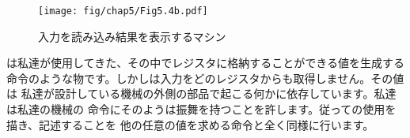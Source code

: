 \begin{figure}[tb]
\label{Figure 5.4}
\centering
\begin{comment}
\heading{Figure 5.4:} A \acronym{GCD} machine that reads inputs and prints results.

\begin{example}
                   .--------.
                    \ read /
                     \____/
                       |
               +-------*------+
               |              |
        a<-rd (X)            (X) b<-rd
               |              |
               V              V           ___
            +-----+        +-----+       /   \
            |  a  |<--(X)--+  b  +----->|  =  |
            +-+-+-+  a<-b  +-+---+       \___/
              | |            |  ^          ^
           +--+ +----+    +--+  |          |
           |         |    |    (X) b<-t   / \
           V         V    V     |        / O \
      .---------.  .---------.  |       /_____\
--(X)->\ print /    \  rem  /   |
   P    \_____/      \_____/    |
                        |       |
                       (X) t<-r |
                        |       |
                        V       |
                     +-----+    |
                     |  t  +----+
                     +-----+
\end{example}

\begin{scheme}
 (controller
  gcd-loop
    (assign a (op read))
    (assign b (op read))
  test-b
    (test (op =) (reg b) (const 0))
    (branch (label gcd-done))
    (assign t (op rem) (reg a) (reg b))
    (assign a (reg b))
    (assign b (reg t))
    (goto (label test-b))
  gcd-done
    (perform (op print) (reg a))
    (goto (label gcd-loop)))
\end{scheme}

\end{comment}
\texttt{[image: fig/chap5/Fig5.4b.pdf]}
\par\bigskip
\noindent
{} 入力を読み込み結果を表示するマシン
\end{figure}

\noindent
{}は私達が使用してきた、その中でレジスタに格納することができる値を生成する
命令のような物です。しかしは入力をどのレジスタからも取得しません。その値は
私達が設計している機械の外側の部品で起こる何かに依存しています。私達は私達の機械の
命令にそのようは振舞を持つことを許します。従って\code{read}の使用を描き、記述することを
他の任意の値を求める命令と全く同様に行います。

